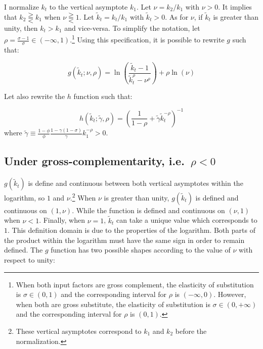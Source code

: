 \documentclass[
]{article}
\begin{document}
I normalize \(k_t\) to the vertical asymptote \(k_1\). Let \(\nu = k_2/k_1\) with \(\nu > 0\). It implies that \(k_2 \gtreqqless k_1\) when \(\nu \gtreqqless 1\). Let \(\tilde{k}_t = k_t / k_1\) with \(\tilde{k}_t > 0\). As for \(\nu\), if \(\tilde{k}_t\) is greater than unity, then \(k_t>k_1\) and vice-versa. To simplify the notation, let \(\rho = \frac{\sigma-1}{\sigma} \in \left(-\infty, 1\right)\).\footnote{When both input factors are gross complement, the elasticity of substitution is \(\sigma \in \left(0,1\right)\) and the corresponding interval for \(\rho\) is \(\left(-\infty, 0\right)\). However, when both are gross substitute, the elasticity of substitution is \(\sigma \in \left(0,+\infty\right)\) and the corresponding interval for \(\rho\) is \(\left(0,1\right)\).} Using this specification, it is possible to rewrite \(g\) such that:

\begin{equation*}
    g(\tilde{k}_t; \nu, \rho) = \ln\left(\frac{\tilde{k}_t - 1}{\tilde{k}_t^\rho - \nu^\rho}\right) + \rho\ln\left(\nu\right)
\end{equation*}

Let also rewrite the \(h\) function such that:

\begin{equation*}
    h(\tilde{k}_t ; \tilde{\gamma}, \rho) = \left( \frac{1}{1-\rho} + \tilde{\gamma} \tilde{k}_t^{-\rho} \right)^{-1}
\end{equation*}
where \(\tilde{\gamma} \equiv \frac{1-\phi}{\phi} \frac{1-\gamma(1-\sigma)}{\gamma} k_1^{-\rho}> 0\).

\hypertarget{under-gross-complementarity-i.e.-rho-0}{%
\subsection{\texorpdfstring{Under gross-complementarity, i.e.~\(\rho < 0\)}{Under gross-complementarity, i.e.~\textbackslash rho \textless{} 0}}\label{under-gross-complementarity-i.e.-rho-0}}

\(g(\tilde{k}_t)\) is define and continuous between both vertical asymptotes within the logarithm, so \(1\) and \(\nu\).\footnote{These vertical asymptotes correspond to \(k_1\) and \(k_2\) before the normalization.} When \(\nu\) is greater than unity, \(g(\tilde{k}_t)\) is defined and continuous on \(\left(1, \nu\right)\). While the function is defined and continuous on \(\left(\nu, 1\right)\) when \(\nu < 1\). Finally, when \(\nu = 1\), \(\tilde{k}_t\) can take a unique value which corresponds to \(1\). This definition domain is due to the properties of the logarithm. Both parts of the product within the logarithm must have the same sign in order to remain defined. The \(g\) function has two possible shapes according to the value of \(\nu\) with respect to unity:
\end{document}
